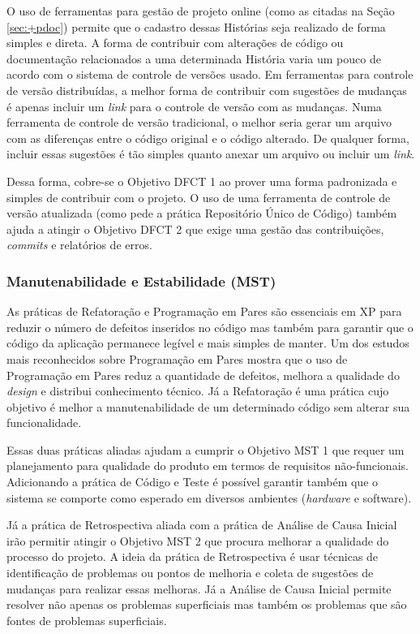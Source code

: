 O uso de ferramentas para gestão de projeto online (como as citadas na
Seção \ref{sec:+pdoc}) permite que o cadastro dessas Histórias seja
realizado de forma simples e direta. A forma de contribuir com
alterações de código ou documentação relacionados a uma determinada
História varia um pouco de acordo com o sistema de controle de versões
usado. Em ferramentas para controle de versão distribuídas, a melhor
forma de contribuir com sugestões de mudanças é apenas incluir um
\textit{link} para o controle de versão com as mudanças. Numa
ferramenta de controle de versão tradicional, o melhor seria gerar um
arquivo com as diferenças entre o código original e o código
alterado. De qualquer forma, incluir essas sugestões é tão simples
quanto anexar um arquivo ou incluir um \textit{link}.

Dessa forma, cobre-se o Objetivo DFCT 1 ao prover uma forma
padronizada e simples de contribuir com o projeto. O uso de uma
ferramenta de controle de versão atualizada (como pede a prática
Repositório Único de Código) também ajuda a atingir o Objetivo DFCT 2
que exige uma gestão das contribuições, \textit{commits} e relatórios
de erros.

\subsubsection{Manutenabilidade e Estabilidade (MST)}
\label{sec:+mst}

As práticas de Refatoração e Programação em Pares são essenciais em XP
para reduzir o número de defeitos inseridos no código mas também para
garantir que o código da aplicação permanece legível e mais simples de
manter. Um dos estudos mais reconhecidos sobre Programação em Pares
\cite{Williams2000} mostra que o uso de Programação em Pares reduz a
quantidade de defeitos, melhora a qualidade do \textit{design} e
distribui conhecimento técnico. Já a Refatoração \cite{Refac01} é uma
prática cujo objetivo é melhor a manutenabilidade de um determinado
código sem alterar sua funcionalidade.

Essas duas práticas aliadas ajudam a cumprir o Objetivo MST 1 que
requer um planejamento para qualidade do produto em termos de
requisitos não-funcionais. Adicionando a prática de Código e Teste é
possível garantir também que o sistema se comporte como esperado em
diversos ambientes (\textit{hardware} e software).

Já a prática de Retrospectiva aliada com a prática de Análise de Causa
Inicial irão permitir atingir o Objetivo MST 2 que procura melhorar a
qualidade do processo do projeto. A ideia da prática de Retrospectiva
\cite{Derby2006} é usar técnicas de identificação de problemas ou
pontos de melhoria e coleta de sugestões de mudanças para realizar
essas melhoras. Já a Análise de Causa Inicial permite resolver não
apenas os problemas superficiais mas também os problemas que são
fontes de problemas superficiais.

